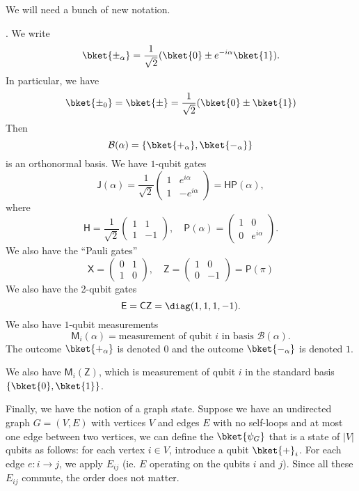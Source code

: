 \documentclass[a4paper]{article}
\newcommand{\qCZ}{\mathsf{CZ}}
\newcommand{\qE}{\mathsf{E}}
\newcommand{\qJ}{\mathsf{J}}
\newcommand{\qM}{\mathsf{M}}
\newcommand{\qH}{\mathsf{H}}
\newcommand{\qP}{\mathsf{P}}
\newcommand{\qX}{\mathsf{X}}
\newcommand{\qZ}{\mathsf{Z}}
\begin{document}
We will need a bunch of new notation.
\begin{notation}.
  We write
  \[
    \bket{\pm_\alpha} = \frac{1}{\sqrt{2}} (\bket{0} \pm e^{-i\alpha} \bket{1}).
  \]
  In particular, we have
  \[
    \bket{\pm_0} = \bket{\pm} = \frac{1}{\sqrt{2}}(\bket{0} \pm \bket{1})
  \]
  Then
  \[
    \mathcal{B}(\alpha) = \{\bket{+_\alpha}, \bket{-_\alpha}\}
  \]
  is an orthonormal basis. We have $1$-qubit gates
  \[
    \qJ(\alpha) = \frac{1}{\sqrt{2}}
    \begin{pmatrix}
      1 & e^{i\alpha}\\
      1 & -e^{i\alpha}
    \end{pmatrix} = \qH \qP(\alpha),
  \]
  where
  \[
    \qH = \frac{1}{\sqrt{2}}
    \begin{pmatrix}
      1 & 1\\
      1 & -1
    \end{pmatrix},\quad \qP(\alpha) =
    \begin{pmatrix}
      1 & 0\\
      0 & e^{i\alpha}
    \end{pmatrix}.
  \]
  We also have the ``Pauli gates''
  \[
    \qX=
    \begin{pmatrix}
      0 & 1\\
      1 & 0
    \end{pmatrix},\quad
    \qZ =
    \begin{pmatrix}
      1 & 0\\
      0 & -1
    \end{pmatrix} = \qP(\pi)
  \]
  We also have the 2-qubit gates
  \[
    \qE = \qCZ = \diag(1, 1, 1, -1).
  \]
  We also have $1$-qubit measurements
  \[
    \qM_i(\alpha) = \text{measurement of qubit $i$ in basis $\mathcal{B}(\alpha)$}.
  \]
  The outcome $\bket{+_\alpha}$ is denoted $0$ and the outcome $\bket{-_\alpha}$ is denoted $1$.

  We also have $\qM_i(\qZ)$, which is measurement of qubit $i$ in the standard basis $\{\bket{0}, \bket{1}\}$.

  Finally, we have the notion of a graph state. Suppose we have an undirected graph $G = (V, E)$ with vertices $V$ and edges $E$ with no self-loops and at most one edge between two vertices, we can define the  $\bket{\psi_G}$ that is a state of $|V|$ qubits as follows: for each vertex $i \in V$, introduce a qubit $\bket{+}_i$. For each edge $e: i \to j$, we apply $E_{ij}$ (ie. $E$ operating on the qubits $i$ and $j$). Since all these $E_{ij}$ commute, the order does not matter.


\end{notation}
\end{document}
